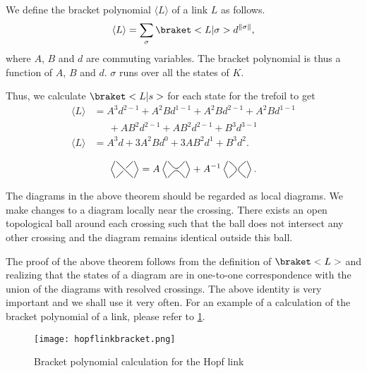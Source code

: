We define the bracket polynomial \(\langle L\rangle\) of a link \(L\) as follows. \[\langle L \rangle = \sum_\sigma\braket<L|\sigma> d^{\norm{\sigma}},\] where \(A\), \(B\) and \(d\) are commuting variables. The bracket polynomial is thus a function of \(A\), \(B\) and \(d\). \(\sigma\) runs over all the states of \(K\).

Thus, we calculate \(\braket<L|s>\) for each state for the trefoil to get
\begin{align*}
    \langle L\rangle &= A^3d^{2-1} + A^2Bd^{1-1} + A^2Bd^{2-1} + A^2Bd^{1-1}\\
					 &\phantom{=\,} + AB^2d^{2-1} + AB^2d^{2-1} + B^3d^{3-1}\\
	\langle L\rangle &= A^3d + 3A^2Bd^0 + 3AB^2d^1 + B^3d^2.
\end{align*}

\begin{thm}
    \[\BB = A\BD + A^{-1}\BE.\]
\end{thm}

The diagrams in the above theorem should be regarded as local diagrams. We make changes to a diagram locally near the crossing. There exists an open topological ball around each crossing such that the ball does not intersect any other crossing and the diagram remains identical outside this ball.

The proof of the above theorem follows from the definition of \(\braket<L>\) and realizing that the states of a diagram are in one-to-one correspondence with the union of the diagrams with resolved crossings. The above identity is very important and we shall use it very often. For an example of a calculation of the bracket polynomial of a link, please refer to \cref{fig:hopflinkbracket}.

\begin{figure}
    \centering
	\texttt{[image: hopflinkbracket.png]}
	\caption{Bracket polynomial calculation for the Hopf link}
	\label{fig:hopflinkbracket}
\end{figure}

